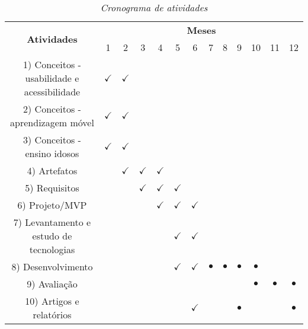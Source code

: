 \begin{table}[!ht]
\centering
\caption{\textit{Cronograma de atividades}}
\label{tab:cronograma}
\begin{tabular}{|c|c|c|c|c|c|c|c|c|c|c|c|c|}
\hline
\multirow{2}{*}{\textbf{Atividades}} & \multicolumn{12}{c|}{\textbf{Meses}} \\ \cline{2-13} 
 & 1 & 2 & 3 & 4 & 5 & 6 & 7 & 8 & 9 & 10 & 11 & 12 \\ \hline
1) Conceitos - usabilidade e acessibilidade & $\checkmark$ & $\checkmark$ &  &  &  &  &  &  &  &  &  &  \\ \hline
2) Conceitos - aprendizagem móvel & $\checkmark$ & $\checkmark$ &  &  &  &  &  &  &  &  &  &  \\ \hline
3) Conceitos - ensino idosos & $\checkmark$ & $\checkmark$ &  &  &  &  &  &  &  &  &  &  \\ \hline
4) Artefatos &  & $\checkmark$ & $\checkmark$ & $\checkmark$ &  &  &  &  &  &  &  &  \\ \hline
5) Requisitos &  &  & $\checkmark$ & $\checkmark$ & $\checkmark$ &  &  &  &  &  &  &  \\ \hline
6) Projeto/MVP &  &  &  & $\checkmark$ & $\checkmark$ & $\checkmark$ &  &  &  &  &  &  \\ \hline
7) Levantamento e estudo de tecnologias &  &  &  &  & $\checkmark$ & $\checkmark$ &  &  &  &  &  &  \\ \hline
8) Desenvolvimento &  &  &  &  & $\checkmark$ & $\checkmark$ & $\bullet$ & $\bullet$ & $\bullet$ & $\bullet$ &  &  \\ \hline
9) Avaliação &  &  &  &  &  &  &  &  &  & $\bullet$ & $\bullet$ & $\bullet$ \\ \hline
10) Artigos e relatórios &  &  &  &  &  & $\checkmark$ &  &  & $\bullet$ &  &  & $\bullet$ \\ \hline
\end{tabular}
\end{table}

